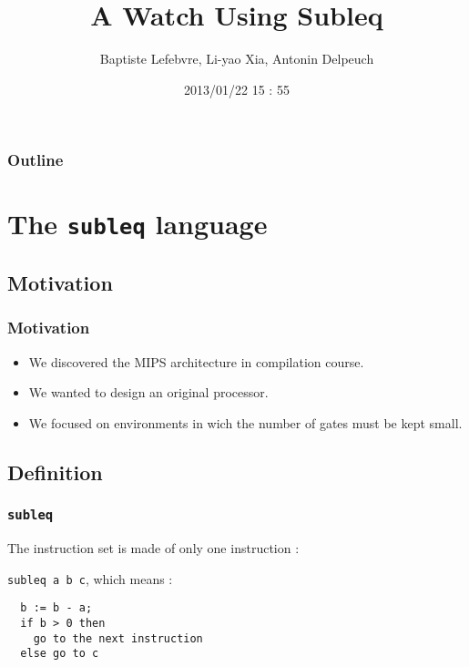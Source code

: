 \documentclass[slidestop]{beamer}
\begin{document}
\makeatletter

\title{A Watch Using Subleq}
\author{Baptiste Lefebvre, Li-yao Xia, Antonin Delpeuch}
\date{2013/01/22 15 : 55}

\begin{frame}
    \maketitle
\end{frame}

\begin{frame}
    \frametitle{Outline}
    \tableofcontents
\end{frame}
\section{The \texttt{subleq} language}
\subsection{Motivation}

\begin{frame}
    \frametitle{Motivation}

    \begin{itemize}
        \item We discovered the MIPS architecture in compilation course.
        \item We wanted to design an original processor.
        \item We focused on environments in wich the number of gates must be kept small.
    \end{itemize}

\end{frame}

\subsection{Definition}
\begin{frame}[fragile]
    \frametitle{\texttt{subleq}}

    The instruction set is made of only one instruction :

    \texttt{subleq a b c}, which means :

\begin{lstlisting}
  b := b - a;
  if b > 0 then
    go to the next instruction
  else go to c
\end{lstlisting}


\end{frame}
\end{document}
